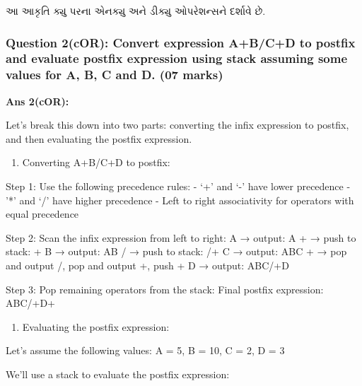 આ આકૃતિ ક્યુ પરના એનક્યુ અને ડીક્યુ ઓપરેશન્સને દર્શાવે છે.

\hypertarget{question-2cor-convert-expression-abcd-to-postfix-and-evaluate-postfix-expression-using-stack-assuming-some-values-for-a-b-c-and-d.-07-marks}{%
\subsubsection{Question 2(cOR): Convert expression A+B/C+D to postfix
and evaluate postfix expression using stack assuming some values for A,
B, C and D. (07
marks)}\label{question-2cor-convert-expression-abcd-to-postfix-and-evaluate-postfix-expression-using-stack-assuming-some-values-for-a-b-c-and-d.-07-marks}}

\textbf{Ans 2(cOR):}

Let's break this down into two parts: converting the infix expression to
postfix, and then evaluating the postfix expression.

\begin{enumerate}
\def\labelenumi{\arabic{enumi}.}
\tightlist
\item
  Converting A+B/C+D to postfix:
\end{enumerate}

Step 1: Use the following precedence rules: - `+' and `-' have lower
precedence - '*' and `/' have higher precedence - Left to right
associativity for operators with equal precedence

Step 2: Scan the infix expression from left to right: A → output: A + →
push to stack: + B → output: AB / → push to stack: /+ C → output: ABC +
→ pop and output /, pop and output +, push + D → output: ABC/+D

Step 3: Pop remaining operators from the stack: Final postfix
expression: ABC/+D+

\begin{enumerate}
\def\labelenumi{\arabic{enumi}.}
\setcounter{enumi}{1}
\tightlist
\item
  Evaluating the postfix expression:
\end{enumerate}

Let's assume the following values: A = 5, B = 10, C = 2, D = 3

We'll use a stack to evaluate the postfix expression:

